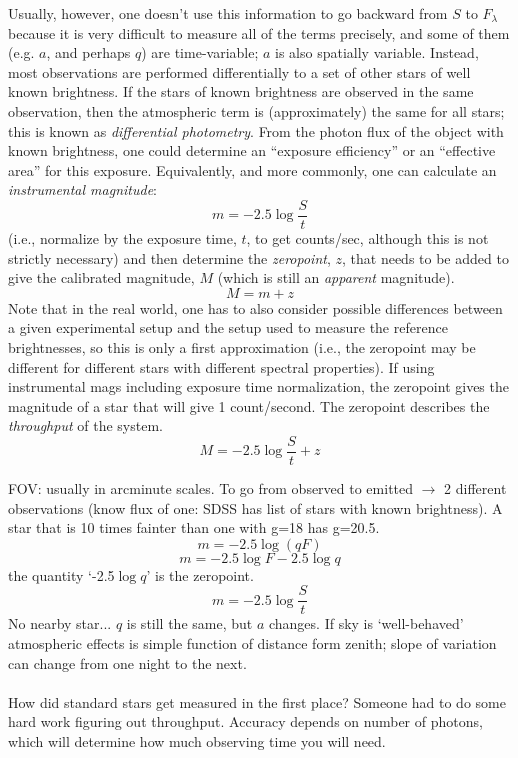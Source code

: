 \documentclass[12pt]{article}
\begin{document}
Usually, however, one doesn't use this information to go
backward from $S$ to $F_{\lambda}$ because it is very
difficult to measure all of the terms precisely, and some of them
(e.g. $a$, and perhaps $q$) are time-variable; $a$ is also spatially
variable. Instead, most observations are performed differentially to a
set of other stars of well known brightness. If the stars of known
brightness are observed in the same observation, then the atmospheric
term is (approximately) the same for all stars; this is known as
\emph{differential photometry}.
From the photon flux of the object with known
brightness, one could determine an ``exposure efficiency''
or an ``effective area'' for this
exposure. Equivalently, and more commonly, one can calculate an
\emph{instrumental magnitude}:
    $$  m = -2.5 \log \frac{S}{t} $$
(i.e., normalize by the exposure time, $t$, to get counts/sec, although this
is not strictly necessary) and then determine the \emph{zeropoint},
$z$, that needs
to be added to give the calibrated magnitude, $M$
(which is still an \emph{apparent} magnitude).
    $$ M = m + z $$
Note that in the real world, one has to also consider possible
differences between a given experimental setup and the setup used to
measure the reference brightnesses, so this is only a first
approximation (i.e., the zeropoint may be different for different
stars with different spectral properties). If using instrumental mags
including exposure time normalization, the zeropoint gives the
magnitude of a star that will give 1 count/second.
\textcolor{myBlue}{The zeropoint describes the \emph{throughput}
of the system.
    $$ M = -2.5\log\frac{S}{t}+z $$}

\textcolor{myBlue}{FOV: usually in arcminute scales.
To go from observed to emitted $\rightarrow$ 2 different observations
(know flux of one: SDSS has list of stars with known brightness).
A star that is 10 times fainter than one with g=18 has g=20.5.
    $$ m = -2.5 \log(qF)$$
    $$ m = -2.5 \log F - 2.5\log q $$
the quantity `-2.5$\log q$' is the zeropoint.
    $$ m = -2.5 \log \frac{S}{t} $$
No nearby star... $q$ is still the same, but $a$ changes.
If sky is `well-behaved' atmospheric effects is simple function
of distance form zenith; slope of variation can change from one
night to the next.\\\\
How did standard stars get measured in the first place?
Someone had to do some hard work figuring out throughput.
Accuracy depends on number of photons, which will determine
how much observing time you will need.}
\end{document}
